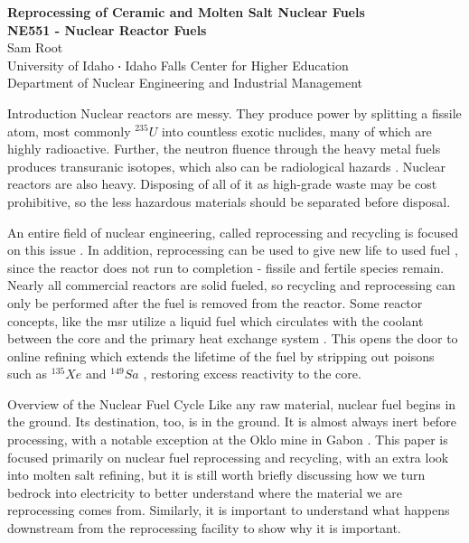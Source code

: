 \documentclass[11pt,a4paper]{article}
\makeatletter
\newcommand*\sq{\mathbin{\vcenter{\hbox{\rule{.3ex}{.3ex}}}}} %
\newcommand{\acf}{\acrfull} %
\renewcommand\section{%
    \@startsection{section}{1}{\z@ }{0.50\baselineskip}{0.25\baselineskip}
    {\normalfont \normalsize \bfseries}}%
\newcommand{\Xe}[1][135]{$^{#1}Xe$ }
\newcommand{\Sa}[1][149]{$^{#1}Sa$ }
\newcommand{\U}[1][]{$^{#1}U$ }
\makeatother
\begin{document}
{\centering
    \textbf{Reprocessing of Ceramic and Molten Salt Nuclear Fuels\\
    NE551 - Nuclear Reactor Fuels\\
    }
    Sam Root\\
    University of Idaho $\sq$ Idaho Falls Center for Higher Education\\
    Department of Nuclear Engineering and Industrial Management
\par
}

\noindent\makebox[\linewidth]{\rule{\textwidth}{0.5pt}} %


\section{Introduction}
Nuclear reactors are messy. They produce power by splitting a fissile atom, most commonly \U[235] into countless exotic nuclides, many of which are highly radioactive. Further, the neutron fluence through the heavy metal fuels produces transuranic isotopes, which also can be radiological hazards \cite{intro}. Nuclear reactors are also heavy. Disposing of all of it as high-grade waste may be cost prohibitive, so the less hazardous materials should be separated before disposal. 

An entire field of nuclear engineering, called reprocessing and recycling is focused on this issue \cite[Ch. 7]{cycle}. In addition, reprocessing can be used to give new life to used fuel \cite[Ch. 10]{chem}, since the reactor does not run to completion - fissile and fertile species remain. Nearly all commercial reactors are solid fueled, so recycling and reprocessing can only be performed after the fuel is removed from the reactor. Some reactor concepts, like the \acf{msr} utilize a liquid fuel which circulates with the coolant between the core and the primary heat exchange system \cite[Ch. 2]{fuel}. This opens the door to online refining which extends the lifetime of the fuel by stripping out poisons such as \Xe and \Sa, restoring excess reactivity to the core. 

\section{Overview of the Nuclear Fuel Cycle}
Like any raw material, nuclear fuel begins in the ground. Its destination, too, is in the ground. It is almost always inert before processing, with a notable exception at the Oklo mine in Gabon \cite{Oklo}. This paper is focused primarily on nuclear fuel reprocessing and recycling, with an extra look into molten salt refining, but it is still worth briefly discussing how we turn bedrock into electricity to better understand where the material we are reprocessing comes from. Similarly, it is important to understand what happens downstream from the reprocessing facility to show why it is important.
\end{document}

